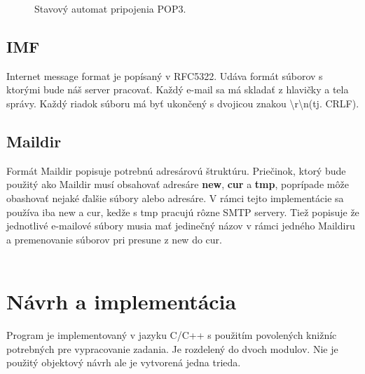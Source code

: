 \documentclass[11pt,a4paper]{article}
\begin{document}
\begin{figure}[h]
  \centering
  \caption{Stavový automat pripojenia POP3.}
  \label{fig:pop3FSM}
\end{figure}


\subsection{IMF}
Internet message format je popísaný v RFC5322\cite{imf}. Udáva formát súborov s ktorými bude náš server pracovať. Každý e-mail sa má skladať z hlavičky a tela správy. Každý riadok súboru má byť ukončený s dvojicou znakou \textbackslash r\textbackslash n(tj. CRLF). 


\subsection{Maildir}
Formát Maildir\cite{maildir} popisuje potrebnú adresárovú štruktúru. Priečinok, ktorý bude použitý ako Maildir musí obsahovať adresáre \textbf{new}, \textbf{cur} a \textbf{tmp}, poprípade môže obashovať nejaké ďalšie súbory alebo adresáre. V rámci tejto implementácie sa používa iba new a cur, kedže s tmp pracujú rôzne SMTP servery. Tiež popisuje že jednotlivé e-mailové súbory musia mať jedinečný názov v rámci jedného Maildiru a premenovanie súborov pri presune z new do cur.\\\\




\section{Návrh a implementácia}
Program je implementovaný v jazyku C/C++ s použitím povolených knižníc potrebných pre vypracovanie zadania. Je rozdelený do dvoch modulov. Nie je použitý objektový návrh ale je vytvorená jedna trieda.  
\end{document}
